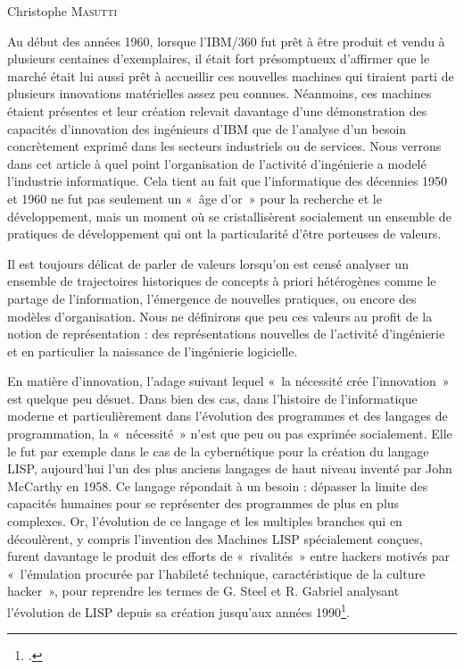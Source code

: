 \documentclass{FramateX}
\begin{document}
\begin{refsection}

\begin{flushright}
Christophe \textsc{Masutti}
\end{flushright}
\vspace{10 mm}

Au début des années 1960, lorsque l'IBM/360 fut prêt à être produit et
vendu à plusieurs centaines d'exemplaires, il était fort présomptueux
d'affirmer que le marché était lui aussi prêt à accueillir ces
nouvelles machines qui tiraient parti de plusieurs innovations
matérielles assez peu connues. Néanmoins, ces machines étaient
présentes et leur création relevait davantage d'une démonstration des
capacités d'innovation des ingénieurs d'IBM que de
l'analyse d'un besoin concrètement exprimé dans les secteurs
industriels ou de services. Nous verrons dans cet article à quel point
l'organisation de l'activité d'ingénierie a modelé l'industrie
informatique. Cela tient au fait que l'informatique des décennies 1950
et 1960 ne fut pas seulement un «~âge d'or~» pour la recherche et le
développement, mais un moment où se cristallisèrent socialement un
ensemble de pratiques de développement qui ont la particularité
d'être porteuses de valeurs. 

Il est toujours délicat de parler de valeurs lorsqu'on
est censé analyser un ensemble de trajectoires historiques de concepts
à priori hétérogènes comme le partage de
l'information, l'émergence de
nouvelles pratiques, ou encore des modèles
d'organisation. Nous ne définirons que peu ces
valeurs au profit de la notion de représentation : des représentations
nouvelles de l'activité d'ingénierie
et en particulier la naissance de l'ingénierie
logicielle.

En matière d'innovation, l'adage
suivant lequel «~la nécessité crée l'innovation~» est
quelque peu désuet. Dans bien des cas, dans l'histoire
de l'informatique moderne et particulièrement dans
l'évolution des programmes et des langages de
programmation, la «~nécessité~» n'est que peu ou pas
exprimée socialement. Elle le fut par exemple dans le cas de la
cybernétique pour la création du langage LISP,
aujourd'hui l'un des plus anciens
langages de haut niveau inventé par John McCarthy en 1958. Ce langage
répondait à un besoin : dépasser la limite des capacités humaines pour
se représenter des programmes de plus en plus complexes. Or,
l'évolution de ce langage et les multiples branches
qui en découlèrent, y compris l'invention des Machines
LISP spécialement conçues, furent davantage le produit des efforts de
«~rivalités~» entre hackers motivés par «~l'émulation
procurée par l'habileté technique, caractéristique de
la culture hacker~», pour reprendre les termes de G. Steel et R.
Gabriel analysant l'évolution de LISP depuis sa
création jusqu'aux années 1990\footnote{\cite{steelejrevolution1993-1}.}.


\end{refsection}
\end{document}
